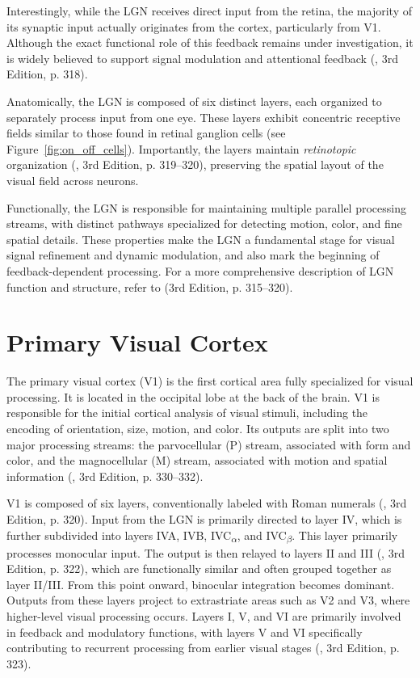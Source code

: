 Interestingly, while the LGN receives direct input from the retina, the majority of its synaptic input actually originates from the cortex, particularly from V1. Although the exact functional role of this feedback remains under investigation, it is widely believed to support signal modulation and attentional feedback (\citet{bear2020neuroscience}, 3rd Edition, p. 318).

Anatomically, the LGN is composed of six distinct layers, each organized to separately process input from one eye. These layers exhibit concentric receptive fields similar to those found in retinal ganglion cells (see Figure~\ref{fig:on_off_cells}). Importantly, the layers maintain \emph{retinotopic} organization (\citet{bear2020neuroscience}, 3rd Edition, p. 319--320), preserving the spatial layout of the visual field across neurons.

Functionally, the LGN is responsible for maintaining multiple parallel processing streams, with distinct pathways specialized for detecting motion, color, and fine spatial details. These properties make the LGN a fundamental stage for visual signal refinement and dynamic modulation, and also mark the beginning of feedback-dependent processing. For a more comprehensive description of LGN function and structure, refer to \citet{bear2020neuroscience} (3rd Edition, p. 315--320).

\section{Primary Visual Cortex}
\label{sec:v1}

The primary visual cortex (V1) is the first cortical area fully specialized for visual processing. It is located in the occipital lobe at the back of the brain. V1 is responsible for the initial cortical analysis of visual stimuli, including the encoding of orientation, size, motion, and color. Its outputs are split into two major processing streams: the parvocellular (P) stream, associated with form and color, and the magnocellular (M) stream, associated with motion and spatial information (\citet{bear2020neuroscience}, 3rd Edition, p. 330--332).

V1 is composed of six layers, conventionally labeled with Roman numerals (\citet{bear2020neuroscience}, 3rd Edition, p. 320). Input from the LGN is primarily directed to layer IV, which is further subdivided into layers IVA, IVB, IVC\textsubscript{\ensuremath{\alpha}}, and IVC\textsubscript{\ensuremath{\beta}}. This layer primarily processes monocular input. The output is then relayed to layers II and III (\citet{bear2020neuroscience}, 3rd Edition, p. 322), which are functionally similar and often grouped together as layer II/III. From this point onward, binocular integration becomes dominant. Outputs from these layers project to extrastriate areas such as V2 and V3, where higher-level visual processing occurs. Layers I, V, and VI are primarily involved in feedback and modulatory functions, with layers V and VI specifically contributing to recurrent processing from earlier visual stages (\citet{bear2020neuroscience}, 3rd Edition, p. 323).

